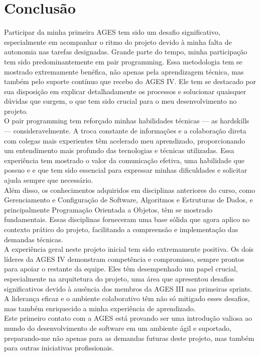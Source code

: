 \section[Conclusão]{Conclusão}

Participar da minha primeira AGES tem sido um desafio significativo, especialmente em acompanhar o ritmo do projeto devido à minha falta de autonomia nas tarefas designadas. Grande parte do tempo, minha participação tem sido predominantemente em pair programming. Essa metodologia tem se mostrado extremamente benéfica, não apenas pela aprendizagem técnica, mas também pelo suporte contínuo que recebo do AGES IV. Ele tem se destacado por sua disposição em explicar detalhadamente os processos e solucionar quaisquer dúvidas que surgem, o que tem sido crucial para o meu desenvolvimento no projeto.\\
O pair programming tem reforçado minhas habilidades técnicas — as hardskills
— consideravelmente. A troca constante de informações e a colaboração direta com colegas mais experientes têm acelerado meu aprendizado, proporcionando um entendimento mais profundo das tecnologias e técnicas utilizadas. Essa experiência tem mostrado o valor da comunicação efetiva, uma habilidade que possuo e e que tem sido essencial para expressar minhas dificuldades e solicitar ajuda sempre que necessário.\\
Além disso, os conhecimentos adquiridos em disciplinas anteriores do curso, como Gerenciamento e Configuração de Software, Algoritmos e Estruturas de Dados, e principalmente Programação Orientada a Objetos, têm se mostrado fundamentais. Essas disciplinas forneceram uma base sólida que agora aplico no contexto prático do projeto, facilitando a compreensão e implementação das demandas técnicas.\\
A experiência geral neste projeto inicial tem sido extremamente positiva. Os dois líderes da AGES IV demonstram competência e compromisso, sempre prontos para apoiar o restante da equipe. Eles têm desempenhado um papel crucial, especialmente na arquitetura do projeto, uma área que apresentou desafios significativos devido à ausência dos membros da AGES III nas primeiras sprints. A liderança eficaz e o ambiente colaborativo têm não só mitigado esses desafios, mas também enriquecido a minha experiência de aprendizado.\\

Este primeiro contato com a AGES está provando ser uma introdução valiosa ao mundo do desenvolvimento de software em um ambiente ágil e suportado, preparando-me não apenas para as demandas futuras deste projeto, mas também para outras iniciativas profissionais.
